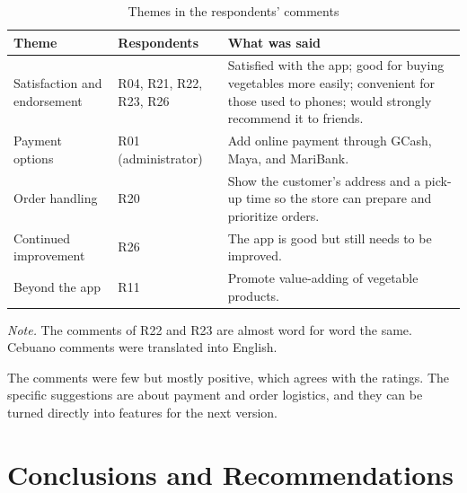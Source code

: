 \documentclass[11pt,a4paper]{article}
\begin{document}
\begin{table}[H]
\centering
\begin{threeparttable}
\caption{Themes in the respondents' comments}
\label{tab:comments}
\small
\begin{tabularx}{\linewidth}{>{\raggedright\arraybackslash}p{3.4cm}>{\raggedright\arraybackslash}p{2.4cm}L}
\toprule
Theme & Respondents & What was said\\
\midrule
Satisfaction and endorsement & R04, R21, R22, R23, R26 & Satisfied with the app; good for buying vegetables more easily; convenient for those used to phones; would strongly recommend it to friends.\\
Payment options & R01 (administrator) & Add online payment through GCash, Maya, and MariBank.\\
Order handling & R20 & Show the customer's address and a pick-up time so the store can prepare and prioritize orders.\\
Continued improvement & R26 & The app is good but still needs to be improved.\\
Beyond the app & R11 & Promote value-adding of vegetable products.\\
\bottomrule
\end{tabularx}
\begin{tablenotes}\footnotesize
\item \textit{Note.} The comments of R22 and R23 are almost word for word the same. Cebuano comments were translated into English.
\end{tablenotes}
\end{threeparttable}
\end{table}

The comments were few but mostly positive, which agrees with the ratings. The specific suggestions are about payment and order logistics, and they can be turned directly into features for the next version.

\section{Conclusions and Recommendations}
\end{document}
